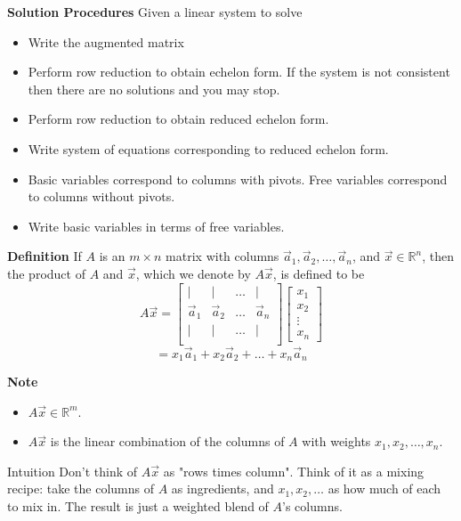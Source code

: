   \begin{frame}[fragile]

\textbf{Solution Procedures} 
Given a linear system to solve
\begin{itemize}
 \item Write the augmented matrix   
 \item Perform row reduction to obtain echelon form.  If the system is not consistent then there are no solutions and you may stop. 
 \item Perform row reduction to obtain reduced echelon form.  
 \item Write system of equations corresponding to reduced echelon form.  
 \item Basic variables correspond to columns with pivots.  Free variables correspond to
 columns without pivots.  
 \item Write basic variables in terms of free variables.
\end{itemize}

\end{frame}


  \begin{frame}[fragile]
\textbf{Definition}
 If $A$ is an $m \times n$ matrix with columns 
 $\vec{a}_1, \vec{a}_2, \dots ,\vec{a}_n$,
and $\vec{x} \in \mathbb R^n$, then the product of $A$ and $\vec{x}$, 
which we denote by $A\vec{x}$, is defined to be 
\[ 
 A \vec{x} = 
 \left[\begin{array}{cccc}
  | & | & \dots & | \\
  \vec{a}_1 & \vec{a}_2 & \dots & \vec{a}_n  \\
  | & | & \dots & | \\
 \end{array}\right]
\left[\begin{array}{r} 
 x_1 \\ x_2 \\ \vdots \\ x_n
\end{array}\right]
\]
\[
 = x_1 \vec{a}_1 + x_2 \vec{a}_2 + \dots + x_n \vec{a}_n
\]


\textbf{Note}
\begin{itemize}
\item $A\vec{x} \in \mathbb R^m$.
\item $A\vec{x}$ is the linear combination of the columns of $A$ with weights $x_1, x_2, \dots, x_n$.
\end{itemize}

\begin{block}{Intuition}
Don't think of $A\vec{x}$ as "rows times column". Think of it as a mixing recipe: take the columns of $A$ as ingredients, and $x_1, x_2, \dots$ as how much of each to mix in. The result is just a weighted blend of $A$'s columns.
\end{block}

\end{frame}


